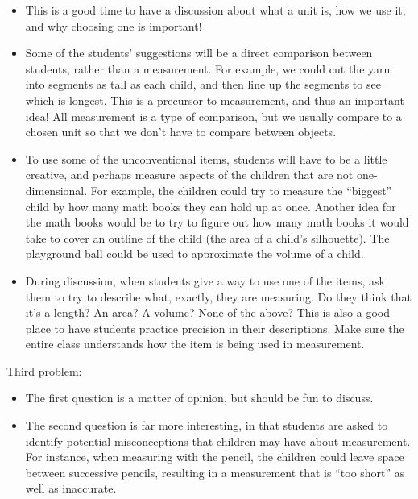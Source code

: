 \documentclass[nooutcomes,noauthor]{ximera}
\begin{document}
\begin{instructorNotes}
\begin{itemize}
\item         This is a good time to have a discussion about what a unit is, how we use it, and why choosing one is important!

\item Some of the students' suggestions will be a direct comparison between students, rather than a measurement. For example, we could cut the yarn into segments as tall as each child, and then line up the segments to see which is longest. This is a precursor to measurement, and thus an important idea! All measurement is a type of comparison, but we usually compare to a chosen unit so that we don't have to compare between objects.
        
\item         To use some of the unconventional items, students will have to be a little creative, and perhaps measure aspects of the children that are not one-dimensional.  For example, the children could try to measure the ``biggest'' child by how many math books they can hold up at once.  Another idea for the math books would be to try to figure out how many math books it would take to cover an outline of the child (the area of a child's silhouette).  The playground ball could be used to approximate the volume of a child.
        
 \item        During discussion, when students give a way to use one of the items, ask them to try to describe what, exactly, they are measuring.  Do they think that it's a length?  An area?  A volume?  None of the above?  This is also a good place to have students practice precision in their descriptions.  Make sure the entire class understands how the item is being used in measurement.

\end{itemize}

Third problem:
\begin{itemize}
       \item  The first question is a matter of opinion, but should be fun to discuss.  
        
      \item   The second question is far more interesting, in that students are asked to identify potential misconceptions that children may have about measurement.  For instance, when measuring with the pencil, the children could leave space between successive pencils, resulting in a measurement that is ``too short'' as well as inaccurate.  
        

\end{itemize}
\end{instructorNotes}
\end{document}
